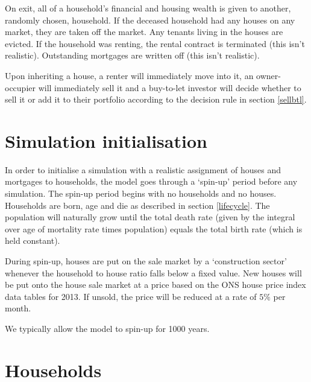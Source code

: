 \documentclass{article}
\begin{document}
On exit, all of a household's financial and housing wealth is given to another, randomly chosen, household. If the deceased household had any houses on any market, they are taken off the market. Any tenants living in the houses are evicted. If the household was renting, the rental contract is terminated (this isn't realistic). Outstanding mortgages are written off (this isn't realistic).

Upon inheriting a house, a renter will immediately move into it, an owner-occupier will immediately sell it and a buy-to-let investor will decide whether to sell it or add it to their portfolio according to the decision rule in section \ref{sellbtl}.
 
\section{Simulation initialisation}
In order to initialise a simulation with a realistic assignment of houses and mortgages to households, the model goes through a `spin-up' period before any simulation. The spin-up period begins with no households and no houses. Households are born, age and die as described in section \ref{lifecycle}. The population will naturally grow until the total death rate (given by the integral over age of mortality rate times population) equals the total birth rate (which is held constant).

During spin-up, houses are put on the sale market by a `construction sector' whenever the household to house ratio falls below a fixed value. New houses will be put onto the house sale market at a price based on the ONS house price index data tables for 2013. If unsold, the price will be reduced at a rate of $5\%$ per month.

We typically allow the model to spin-up for 1000 years.

\section{Households}
\end{document}

